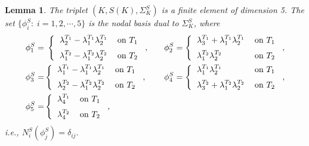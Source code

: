 \documentclass[twoside,reqno,final]{amsart}
\newtheorem{lemma}{Lemma}
\begin{document}
\begin{lemma}
\label{lemma-1}
The triplet  $(K,S(K), \Sigma^{S}_K)$ is a finite element of dimension 5.
The set $\{\phi^S_i:\;i=1,2,\cdots,5\}$ is the nodal basis dual to 
$\Sigma^S_K$, where 
 \begin{alignat*}{3}
  \phi_1^S =&\;
  \left\{ \begin{tabular}{l l}
            $\lambda_2^{T_1}-\lambda_1^{T_1}\lambda_2^{T_1}$ & on $T_1$\vspace{0.2cm}\\
            $\lambda_1^{T_2}-\lambda_1^{T_2}\lambda_2^{T_2}$ & on $T_2$
            \end{tabular}\right.,
\quad &&  
  \phi_2^S =\left\{ \begin{tabular}{l l}
            $\lambda_3^{T_1}+\lambda_1^{T_1}\lambda_2^{T_1}$ & on $T_1$\vspace{0.2cm}\\
            $\lambda_1^{T_2}\lambda_2^{T_2}$ & on $T_2$
            \end{tabular}\right.,\\
\phi_3^S =&
\left\{ \begin{tabular}{l l}
            $\lambda_1^{T_1}-\lambda_1^{T_1}\lambda_2^{T_1}$ & on $T_1$\vspace{0.2cm}\\
            $\lambda_2^{T_2}-\lambda_1^{T_2}\lambda_2^{T_2}$ & on $T_2$
            \end{tabular}\right.,
\quad &&  
  \phi_4^S =
  \left\{ \begin{tabular}{l l}
            $\lambda_1^{T_1}\lambda_2^{T_1}$ & on $T_1$\vspace{0.2cm}\\
            $\lambda_3^{T_2}+\lambda_1^{T_2}\lambda_2^{T_2}$ & on $T_2$
            \end{tabular}\right.,
\\
  \phi_5^S =&
   \left\{ \begin{tabular}{l l}
            $\lambda_4^{T_1}$ & on $T_1$\vspace{0.2cm}\\
            $\lambda_4^{T_2}$ & on $T_2$
            \end{tabular}\right.,
 \end{alignat*}
 i.e., $
N_i^S (\phi_j^S) = \delta_{ij}. 
$
\end{lemma}
\end{document}
